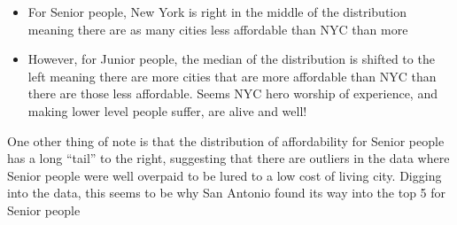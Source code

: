 \documentclass[11pt]{article}
\providecommand{\tightlist}{%
      \setlength{\itemsep}{0pt}\setlength{\parskip}{0pt}}
\begin{document}
\begin{itemize}
\tightlist
\item
  For Senior people, New York is right in the middle of the distribution
  meaning there are as many cities less affordable than NYC than more
\item
  However, for Junior people, the median of the distribution is shifted
  to the left meaning there are more cities that are more affordable
  than NYC than there are those less affordable. Seems NYC hero worship
  of experience, and making lower level people suffer, are alive and
  well!
\end{itemize}

One other thing of note is that the distribution of affordability for
Senior people has a long ``tail'' to the right, suggesting that there
are outliers in the data where Senior people were well overpaid to be
lured to a low cost of living city. Digging into the data, this seems to
be why San Antonio found its way into the top 5 for Senior people
\end{document}
